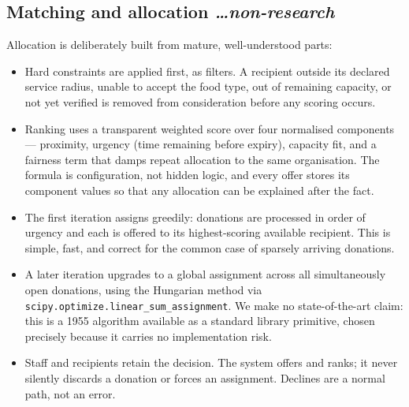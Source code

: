 \documentclass[11pt,a4paper]{article}
\newcommand{\BvrHint}[1]{%
  {\normalfont\normalsize\itshape\hfill #1}}
\begin{document}
\subsection{Matching and allocation %
\BvrHint{\ldots non-research}}
Allocation is deliberately built from mature, well-understood parts:
\begin{itemize}[leftmargin=0.7cm]
    \item Hard constraints are applied first, as filters. A recipient outside its declared service radius, unable to accept the food type, out of remaining capacity, or not yet verified is removed from consideration before any scoring occurs.
    \item Ranking uses a transparent weighted score over four normalised components --- proximity, urgency (time remaining before expiry), capacity fit, and a fairness term that damps repeat allocation to the same organisation. The formula is configuration, not hidden logic, and every offer stores its component values so that any allocation can be explained after the fact.
    \item The first iteration assigns greedily: donations are processed in order of urgency and each is offered to its highest-scoring available recipient. This is simple, fast, and correct for the common case of sparsely arriving donations.
    \item A later iteration upgrades to a global assignment across all simultaneously open donations, using the Hungarian method via \texttt{scipy.optimize.linear\_sum\_assignment}. We make no state-of-the-art claim: this is a 1955 algorithm available as a standard library primitive, chosen precisely because it carries no implementation risk.
    \item Staff and recipients retain the decision. The system offers and ranks; it never silently discards a donation or forces an assignment. Declines are a normal path, not an error.
\end{itemize}
\end{document}
